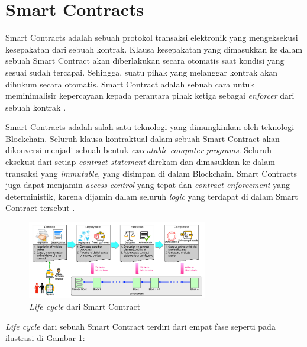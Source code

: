 \section{Smart Contracts}
\label{sec:smart-contract}

Smart Contracts adalah sebuah protokol transaksi elektronik yang mengeksekusi kesepakatan dari sebuah kontrak. Klausa kesepakatan yang dimasukkan ke dalam sebuah Smart Contract akan diberlakukan secara otomatis saat kondisi yang sesuai sudah tercapai. Sehingga, suatu pihak yang melanggar kontrak akan dihukum secara otomatis. Smart Contract adalah sebuah cara untuk meminimalisir kepercayaan kepada perantara pihak ketiga sebagai \textit{enforcer} dari sebuah kontrak \parencite{szabo1997formalizing}.

Smart Contracts adalah salah satu teknologi yang dimungkinkan oleh teknologi Blockchain. Seluruh klausa kontraktual dalam sebuah Smart Contract akan dikonversi menjadi sebuah bentuk \textit{executable computer programs}. Seluruh eksekusi dari setiap \textit{contract statement} direkam dan dimasukkan ke dalam transaksi yang \textit{immutable}, yang disimpan di dalam Blockchain. Smart Contracts juga dapat menjamin \textit{access control} yang tepat dan \textit{contract enforcement} yang deterministik, karena dijamin dalam seluruh \textit{logic} yang terdapat di dalam Smart Contract tersebut \parencite{zheng2020overview}.

\begin{figure}[ht]
	\centering
	\includegraphics[width=0.7\textwidth]{resources/chapter-2/sc-lifecycle.png}
	\caption{\textit{Life cycle} dari Smart Contract \parencite{zheng2020overview}}
	\label{image:sc-lifecycle}
\end{figure}

\textit{Life cycle} dari sebuah Smart Contract terdiri dari empat fase seperti pada ilustrasi di Gambar \ref{image:sc-lifecycle}:

